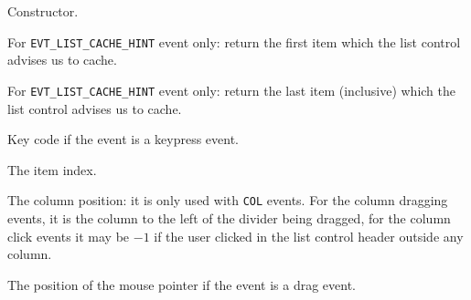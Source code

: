 





Constructor.


\label{wxlisteventgetcachefrom}


For {\tt EVT\_LIST\_CACHE\_HINT} event only: return the first item which the
list control advises us to cache.


\label{wxlisteventgetcacheto}


For {\tt EVT\_LIST\_CACHE\_HINT} event only: return the last item (inclusive)
which the list control advises us to cache.


\label{wxlisteventgetkeycode}


Key code if the event is a keypress event.


\label{wxlisteventgetindex}


The item index.


\label{wxlisteventgetcolumn}


The column position: it is only used with {\tt COL} events. For the column
dragging events, it is the column to the left of the divider being dragged, for
the column click events it may be $-1$ if the user clicked in the list control
header outside any column.


\label{wxlisteventgetpoint}


The position of the mouse pointer if the event is a drag event.



\label{wxlisteventgetlabel}

